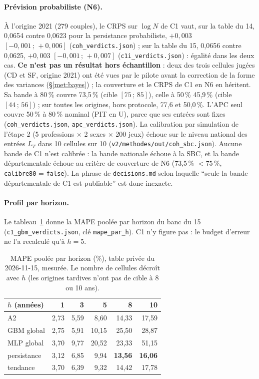 \paragraph{Prévision probabiliste (N6).} À l'origine 2021 (279 couples), le CRPS sur $\log N$ de C1 vaut,
sur la table du 14, 0,0654\mesure{} contre 0,0623\mesure{} pour la persistance probabiliste, $+0{,}003$
$[-0{,}001\,;\,+0{,}006]$\mesure{} (\texttt{coh\_verdicts.json}) ; sur la table du 15, 0,0656\mesure{}
contre 0,0625\mesure, $+0{,}003$ $[-0{,}001\,;\,+0{,}007]$\mesure{} (\texttt{c1i\_verdicts.json}) :
égalité dans les deux cas. \textbf{Ce n'est pas un résultat hors échantillon} : deux des trois cellules
jugées (CD et SF, origine 2021) ont été vues par le pilote avant la correction de la forme des variances
(\S\ref{met:bayes}) ; la couverture et le CRPS de C1 en N6 en héritent. Sa bande à 80\,\% couvre 73,5\,\%\mesure{} (cible
$[75\,;\,85]$), celle à 50\,\% 45,9\,\%\mesure{} (cible $[44\,;\,56]$) ; sur toutes les origines, hors
protocole, 77,6 et 50,0\,\%\mesure. L'APC seul couvre 50\,\%\mesure{} à 80\,\% nominal (PIT en U), parce
que ses entrées sont fixes (\texttt{coh\_verdicts.json}, \texttt{apc\_verdicts.json}). La calibration par
simulation de l'étape 2 (5 professions $\times$ 2 sexes $\times$ 200 jeux) échoue sur le niveau national
des entrées $L_T$ dans 10 cellules sur 10\mesure{} (\texttt{v2/methodes/out/coh\_sbc.json}). Aucune bande de C1 n'est calibrée : la bande nationale échoue à
la SBC, et la bande départementale échoue au critère de couverture de N6 (73,5\,\% $< 75$\,\%,
\texttt{calibre80} = \texttt{false}\mesure). La phrase de \texttt{decisions.md} selon laquelle \enquote{seule
la bande départementale de C1 est publiable} est donc inexacte.

\paragraph{Profil par horizon.} Le tableau~\ref{met:tab:horizon} donne la MAPE poolée par horizon du banc
du 15 (\texttt{c1\_gbm\_verdicts.json}, clé \texttt{mape\_par\_h}). C1 n'y figure pas : le budget d'erreur
ne l'a recalculé qu'à $h = 5$.

\begin{table}[ht]
\centering\small
\begin{tabular}{@{}lrrrrr@{}}
\toprule
$h$ (années) & 1 & 3 & 5 & 8 & 10 \\
\midrule
A2 & 2,73 & 5,59 & 8,60 & 14,33 & 17,59 \\
GBM global & 2,75 & 5,91 & 10,15 & 25,50 & 28,87 \\
MLP global & 3,70 & 9,77 & 20,52 & 23,33 & 51,15 \\
persistance & 3,12 & 6,85 & 9,94 & \textbf{13,56} & \textbf{16,06} \\
tendance & 3,70 & 6,39 & 9,32 & 14,42 & 17,78 \\
\bottomrule
\end{tabular}
\caption{MAPE poolée par horizon (\%), table privée du 2026-11-15, mesurée\mesure. Le nombre de cellules
décroît avec $h$ (les origines tardives n'ont pas de cible à 8 ou 10 ans).}
\label{met:tab:horizon}
\end{table}

